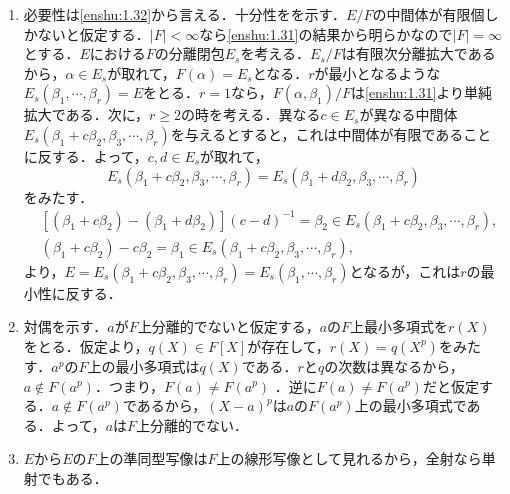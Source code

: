 \documentclass[a4paper,10pt]{ltjsarticle}
\begin{document}
\begin{enumerate}[]
  \begin{align*}
    & \deg p_M \cdot [M : M \cap K] = [E : M][M : M \cap K] = [E : M \cap K] = \deg p_{M \cap K} \\
    & \Longrightarrow [M : M \cap K] = 1 \\
    & \Longrightarrow M = M \cap K \\
    & \Longrightarrow M \subset K.
  \end{align*}
  同様に，$K \subset M$が言えて，$M = K$．$E / F$の中間体から，$p$の既約因子のいくつかの積全体への単射を得る．これの値域の元はいずれも$(X - \theta)$で割り切れるから，$E / F$の中間体の総数は$2^{n - 1}$以下．
  \item \label{enshu:1.33} 必要性は\ref{enshu:1.32}から言える．十分性をを示す．$E / F$の中間体が有限個しかないと仮定する．$|F| < \infty$なら\ref{enshu:1.31}の結果から明らかなので$|F| = \infty$とする．$E$における$F$の分離閉包$E_s$を考える．$E_s / F$は有限次分離拡大であるから，$\alpha \in E_s$が取れて，$F(\alpha) = E_s$となる．$r$が最小となるような$E_s(\beta_1, \cdots, \beta_r) = E$をとる．$r = 1$なら，$F(\alpha, \beta_1) / F$は\ref{enshu:1.31}より単純拡大である．次に，$r \ge 2$の時を考える．異なる$c \in E_s$が異なる中間体$E_s(\beta_1 + c\beta_2, \beta_3, \cdots, \beta_r)$を与えるとすると，これは中間体が有限であることに反する．よって，$c, d \in E_s$が取れて，
  \[ E_s(\beta_1 + c \beta_2, \beta_3, \cdots, \beta_r) = E_s(\beta_1 + d \beta_2, \beta_3, \cdots, \beta_r) \]
  をみたす．
  \begin{align*}
    & [(\beta_1 + c \beta_2) - (\beta_1 + d \beta_2)](c - d)^{-1} = \beta_2 \in E_s(\beta_1 + c \beta_2, \beta_3, \cdots, \beta_r), \\
    & (\beta_1 + c \beta_2) - c \beta_2 = \beta_1 \in E_s(\beta_1 + c \beta_2, \beta_3, \cdots, \beta_r),
  \end{align*}
  より，$E = E_s(\beta_1 + c \beta_2, \beta_3, \cdots, \beta_r) = E_s(\beta_1, \cdots, \beta_r)$となるが，これは$r$の最小性に反する．
  \item \label{enshu:1.34} 対偶を示す．$a$が$F$上分離的でないと仮定する，$a$の$F$上最小多項式を$r(X)$をとる．仮定より，$q(X) \in F[X]$が存在して，$r(X)  = q(X ^ p)$をみたす．$a^p$の$F$上の最小多項式は$q(X)$である．$r$と$q$の次数は異なるから，$a\notin F(a^p)$．つまり，$F(a) \ne F(a ^ p)$ ．逆に$F(a) \ne F(a ^ p)$だと仮定する．$a \notin F(a ^ p)$であるから，$(X - a) ^ p$は$a$の$F(a ^ p)$上の最小多項式である．よって，$a$は$F$上分離的でない．
  \item \label{enshu:1.35} $E$から$E$の$F$上の準同型写像は$F$上の線形写像として見れるから，全射なら単射でもある．

\end{enumerate}
\end{document}
